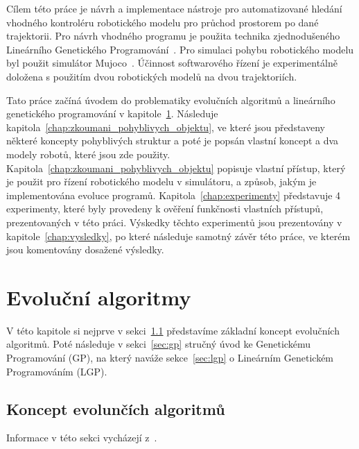 Cílem této práce je návrh a implementace nástroje pro automatizované hledání vhodného kontroléru robotického modelu pro průchod prostorem po dané trajektorii.
Pro návrh vhodného programu je použita technika zjednodušeného Lineárního Genetického Programování~\cite{Brameier2010}.
Pro simulaci pohybu robotického modelu byl použit simulátor Mujoco~\cite{Todorov2012}.
Účinnost softwarového řízení je experimentálně doložena s použitím dvou robotických modelů na dvou trajektoriích.

Tato práce začíná úvodem do problematiky evolučních algoritmů a lineárního genetického programování v kapitole~\ref{chap:evolucni_algoritmy}.
Následuje kapitola~\ref{chap:zkoumani_pohyblivych_objektu}, ve které jsou představeny některé koncepty pohyblivých struktur a poté je popsán vlastní koncept a dva modely robotů, které jsou zde použity.
Kapitola~\ref{chap:zkoumani_pohyblivych_objektu} popisuje vlastní přístup, který je použit pro řízení robotického modelu v simulátoru, a způsob, jakým je implementována evoluce programů.
Kapitola~\ref{chap:experimenty} představuje 4 experimenty, které byly provedeny k ověření funkčnosti vlastních přístupů, prezentovaných v této práci.
Výskedky těchto experimentů jsou prezentovány v kapitole~\ref{chap:vysledky}, po které následuje samotný závěr této práce, ve kterém jsou komentovány dosažené výsledky.


\chapter{Evoluční algoritmy}
\label{chap:evolucni_algoritmy}

V této kapitole si nejprve v sekci~\ref{sec:koncept_ea} představíme základní koncept evolučních algoritmů.
Poté následuje v sekci~\ref{sec:gp} stručný úvod ke Genetickému Programování (GP), na který naváže sekce~\ref{sec:lgp} o Lineárním Genetickém Programováním (LGP).

\section{Koncept evolunčích algoritmů}
\label{sec:koncept_ea}
Informace v této sekci vycházejí z~\cite{Eiben2015}.

